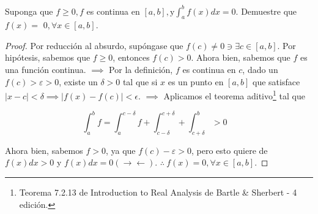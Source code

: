 





\begin{problema}
	Suponga que $f \geq 0, f$ es continua en $[a, b], \mathrm{y} \int_{a}^{b} f(x) d x=0 .$ Demuestre que $f(x)=$ $0, \forall x \in[a, b]$.
\end{problema}

\begin{proof}
	Por reducción al absurdo, supóngase que $f(c)\neq 0\ni \exists c\in [a,b] $. Por hipótesis, sabemos que $f\geq 0$, entonces $f(c)>0$. Ahora bien, sabemos que $f$ es una función continua. $\implies$ Por la definición, $f$ es continua en $c$, dado un $f(c)>\varepsilon >0$, existe un $\delta >0$ tal que si $x$ es un punto en $[a,b]$ que satisface $|x-c|<\delta \implies |f(x)-f(c)|<\epsilon$. $\implies$ Aplicamos el teorema aditivo\footnote{Teorema 7.2.13 de Introduction to Real Analysis de Bartle \& Sherbert - 4 edición.} tal que 
	
	$$\int_a^b f= \int_a^{c-\delta } f +\int_{c-\delta}^{c+\delta}+\int_{c+\delta}^{b}>0 \quad \text{}$$
	
Ahora bien, sabemos $f>0$, ya que $f(c)-\varepsilon>0$, pero esto quiere de $f(x)dx>0 $ y $f(x)dx=0 (\to\gets)$. $\therefore \ f(x)=0, \forall x\in [a,b]$. 

\end{proof}





